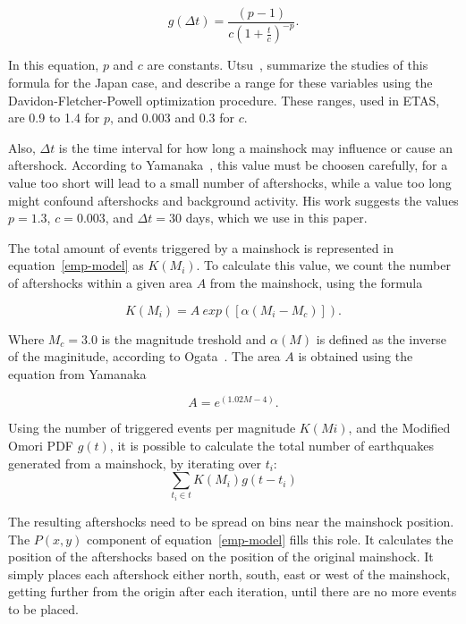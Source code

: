 \begin{equation}\label{omori}
  g(\Delta t)= \frac{(p-1)}{c(1+ \frac{t}{c})^{-p}}.
\end{equation}

In this equation, $p$ and $c$ are
constants. Utsu~\cite{utsu1995centenary}, summarize the studies of
this formula for the Japan case, and describe a range for these
variables using the Davidon-Fletcher-Powell optimization
procedure. These ranges, used in ETAS, are 0.9 to 1.4 for $p$, and
0.003 and 0.3 for $c$.

Also, $\Delta t$ is the time interval for how long a mainshock may
influence or cause an aftershock. According to
Yamanaka~\cite{yamanaka1990scaling}, this value must be choosen
carefully, for a value too short will lead to a small number of
aftershocks, while a value too long might confound aftershocks and
background activity. His work suggests the values $p = 1.3$, $c =
0.003$, and $\Delta t = 30$ days, which we use in this paper.

The total amount of events triggered by a mainshock is represented in
equation~\ref{emp-model} as $K(M_i)$. To calculate this value,
we count the number of aftershocks within a given area $A$ from
the mainshock, using the formula

\begin{equation}\label{triggered}
 K(M_i) = A\ exp([\alpha(M_i-M_c)]).
\end{equation}

Where $M_c = 3.0$ is the magnitude treshold and $\alpha(M)$ is defined
as the inverse of the maginitude, according to
Ogata~\cite{ogata2006space}. The area $A$ is obtained using the
equation from Yamanaka~\cite{yamanaka1990scaling}

\begin{equation}
A = e^{(1.02M -4)}.
\end{equation}

Using the number of triggered events per magnitude $K(Mi)$, and the
Modified Omori PDF $g(t)$, it is possible to calculate the total
number of earthquakes generated from a mainshock, by iterating
over $t_i$:
\begin{equation}
\displaystyle\sum_{t_i \in t} K(M_i)g(t-t_i)
\end{equation}

The resulting aftershocks need to be spread on bins near the mainshock
position. The $P(x,y)$ component of equation~\ref{emp-model} fills
this role. It calculates the position of the aftershocks based on the
position of the original mainshock. It simply places each aftershock
either north, south, east or west of the mainshock, getting further
from the origin after each iteration, until there are no more events
to be placed.

